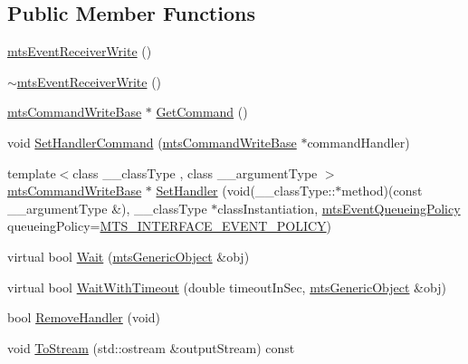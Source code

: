 \subsection*{Public Member Functions}
\begin{DoxyCompactItemize}
\item 
\hyperlink{classmts_event_receiver_write_a119ce623a0ccbef34db32507b55b0ca1}{mts\-Event\-Receiver\-Write} ()
\item 
\hyperlink{classmts_event_receiver_write_aebccfcc96743e1326633cdadcaa84a78}{$\sim$mts\-Event\-Receiver\-Write} ()
\item 
\hyperlink{classmts_command_write_base}{mts\-Command\-Write\-Base} $\ast$ \hyperlink{classmts_event_receiver_write_adf463bcd5e22775924a1eacad44fdf1f}{Get\-Command} ()
\item 
void \hyperlink{classmts_event_receiver_write_a3913dcaf55d377ca5bd07a21dbe768af}{Set\-Handler\-Command} (\hyperlink{classmts_command_write_base}{mts\-Command\-Write\-Base} $\ast$command\-Handler)
\item 
{\footnotesize template$<$class \-\_\-\-\_\-class\-Type , class \-\_\-\-\_\-argument\-Type $>$ }\\\hyperlink{classmts_command_write_base}{mts\-Command\-Write\-Base} $\ast$ \hyperlink{classmts_event_receiver_write_af1a1ff29b204324a2e112891a720b770}{Set\-Handler} (void(\-\_\-\-\_\-class\-Type\-::$\ast$method)(const \-\_\-\-\_\-argument\-Type \&), \-\_\-\-\_\-class\-Type $\ast$class\-Instantiation, \hyperlink{mts_forward_declarations_8h_a9286ac2ca46e5bcd57059550faa96916}{mts\-Event\-Queueing\-Policy} queueing\-Policy=\hyperlink{mts_forward_declarations_8h_a9286ac2ca46e5bcd57059550faa96916a3d4338e85690d50e9ab167be77cdefa0}{M\-T\-S\-\_\-\-I\-N\-T\-E\-R\-F\-A\-C\-E\-\_\-\-E\-V\-E\-N\-T\-\_\-\-P\-O\-L\-I\-C\-Y})
\item 
virtual bool \hyperlink{classmts_event_receiver_write_ad7f8bb9b2defdb6c83d796452dc4aa0d}{Wait} (\hyperlink{classmts_generic_object}{mts\-Generic\-Object} \&obj)
\item 
virtual bool \hyperlink{classmts_event_receiver_write_a7b2264ea198deafacc718d8684f0f5d6}{Wait\-With\-Timeout} (double timeout\-In\-Sec, \hyperlink{classmts_generic_object}{mts\-Generic\-Object} \&obj)
\item 
bool \hyperlink{classmts_event_receiver_write_a2cbad989a059f869eb5d19f2a2f1c9a4}{Remove\-Handler} (void)
\item 
void \hyperlink{classmts_event_receiver_write_a2a00fee6e19110e1e041f5ca498d14dc}{To\-Stream} (std\-::ostream \&output\-Stream) const 
\end{DoxyCompactItemize}
